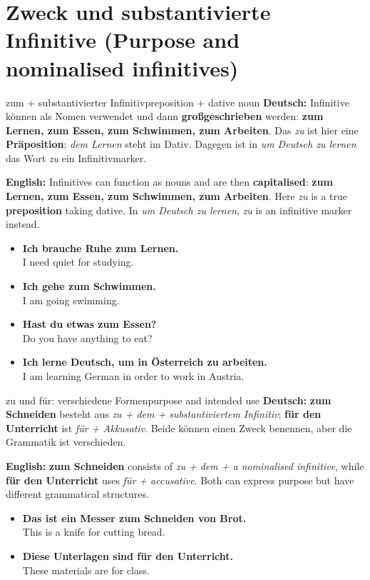 \documentclass[a4paper,11pt]{article}
\newcommand{\GermanText}[1]{\textbf{Deutsch: }#1\par}
\newcommand{\EnglishText}[1]{{\small\color{SoftGray}\textbf{English: }#1\par}}
\newcommand{\ExampleItem}[2]{\item \textbf{#1}\\{\small\color{SoftGray}#2}}
\begin{document}
\section{Zweck und substantivierte Infinitive (Purpose and nominalised infinitives)}
\begin{grammarentry}{zum + substantivierter Infinitiv}{preposition + dative noun}
\GermanText{Infinitive können als Nomen verwendet und dann \textbf{großgeschrieben} werden: \textbf{zum Lernen, zum Essen, zum Schwimmen, zum Arbeiten}. Das \emph{zu} ist hier eine \textbf{Präposition}; \emph{dem Lernen} steht im Dativ. Dagegen ist in \emph{um Deutsch zu lernen} das Wort \emph{zu} ein Infinitivmarker.}
\EnglishText{Infinitives can function as nouns and are then \textbf{capitalised}: \textbf{zum Lernen, zum Essen, zum Schwimmen, zum Arbeiten}. Here \emph{zu} is a true \textbf{preposition} taking dative. In \emph{um Deutsch zu lernen}, \emph{zu} is an infinitive marker instead.}
\end{grammarentry}
\begin{exbox}\begin{itemize}
\ExampleItem{Ich brauche Ruhe zum Lernen.}{I need quiet for studying.}
\ExampleItem{Ich gehe zum Schwimmen.}{I am going swimming.}
\ExampleItem{Hast du etwas zum Essen?}{Do you have anything to eat?}
\ExampleItem{Ich lerne Deutsch, um in Österreich zu arbeiten.}{I am learning German in order to work in Austria.}
\end{itemize}\end{exbox}
\begin{grammarentry}{zu und für: verschiedene Formen}{purpose and intended use}
\GermanText{\textbf{zum Schneiden} besteht aus \emph{zu + dem + substantiviertem Infinitiv}; \textbf{für den Unterricht} ist \emph{für + Akkusativ}. Beide können einen Zweck benennen, aber die Grammatik ist verschieden.}
\EnglishText{\textbf{zum Schneiden} consists of \emph{zu + dem + a nominalised infinitive}, while \textbf{für den Unterricht} uses \emph{für + accusative}. Both can express purpose but have different grammatical structures.}
\end{grammarentry}
\begin{exbox}\begin{itemize}
\ExampleItem{Das ist ein Messer zum Schneiden von Brot.}{This is a knife for cutting bread.}
\ExampleItem{Diese Unterlagen sind für den Unterricht.}{These materials are for class.}
\end{itemize}\end{exbox}
\end{document}
